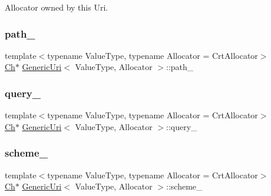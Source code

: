 Allocator owned by this Uri. 

\mbox{\label{classGenericUri_a234d1bbd4ad0aa541ddb112324112c0c}} 
\subsubsection{\texorpdfstring{path\+\_\+}{path\_}}
{\footnotesize\ttfamily template$<$typename Value\+Type, typename Allocator = Crt\+Allocator$>$ \\
\hyperlink{classGenericUri_a20d0602cff62211d89bc4b25963beeee}{Ch}$\ast$ \hyperlink{classGenericUri}{Generic\+Uri}$<$ Value\+Type, Allocator $>$\+::path\+\_\+\hspace{0.3cm}{\ttfamily [private]}}

\mbox{\label{classGenericUri_a4e48c494a9ce691cf1e582110d591a5a}} 
\subsubsection{\texorpdfstring{query\+\_\+}{query\_}}
{\footnotesize\ttfamily template$<$typename Value\+Type, typename Allocator = Crt\+Allocator$>$ \\
\hyperlink{classGenericUri_a20d0602cff62211d89bc4b25963beeee}{Ch}$\ast$ \hyperlink{classGenericUri}{Generic\+Uri}$<$ Value\+Type, Allocator $>$\+::query\+\_\+\hspace{0.3cm}{\ttfamily [private]}}

\mbox{\label{classGenericUri_a0a7f212c8f2c7a4d50bb855d6f85db7e}} 
\subsubsection{\texorpdfstring{scheme\+\_\+}{scheme\_}}
{\footnotesize\ttfamily template$<$typename Value\+Type, typename Allocator = Crt\+Allocator$>$ \\
\hyperlink{classGenericUri_a20d0602cff62211d89bc4b25963beeee}{Ch}$\ast$ \hyperlink{classGenericUri}{Generic\+Uri}$<$ Value\+Type, Allocator $>$\+::scheme\+\_\+\hspace{0.3cm}{\ttfamily [private]}}

